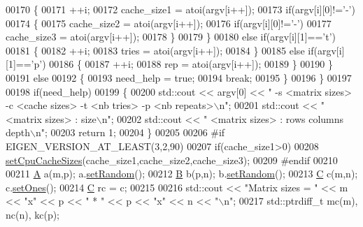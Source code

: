 \begin{DoxyCode}
00170       \{
00171         ++i;
00172         cache\_size1 = atoi(argv[i++]);
00173         \textcolor{keywordflow}{if}(argv[i][0]!=\textcolor{charliteral}{'-'})
00174         \{
00175           cache\_size2 = atoi(argv[i++]);
00176           \textcolor{keywordflow}{if}(argv[i][0]!=\textcolor{charliteral}{'-'})
00177             cache\_size3 = atoi(argv[i++]);
00178         \}
00179       \}
00180       \textcolor{keywordflow}{else} \textcolor{keywordflow}{if}(argv[i][1]==\textcolor{charliteral}{'t'})
00181       \{
00182         ++i;
00183         tries = atoi(argv[i++]);
00184       \}
00185       \textcolor{keywordflow}{else} \textcolor{keywordflow}{if}(argv[i][1]==\textcolor{charliteral}{'p'})
00186       \{
00187         ++i;
00188         rep = atoi(argv[i++]);
00189       \}
00190     \}
00191     \textcolor{keywordflow}{else}
00192     \{
00193       need\_help = \textcolor{keyword}{true};
00194       \textcolor{keywordflow}{break};
00195     \}
00196   \}
00197 
00198   \textcolor{keywordflow}{if}(need\_help)
00199   \{
00200     std::cout << argv[0] << \textcolor{stringliteral}{" -s <matrix sizes> -c <cache sizes> -t <nb tries> -p <nb repeats>\(\backslash\)n"};
00201     std::cout << \textcolor{stringliteral}{"   <matrix sizes> : size\(\backslash\)n"};
00202     std::cout << \textcolor{stringliteral}{"   <matrix sizes> : rows columns depth\(\backslash\)n"};
00203     \textcolor{keywordflow}{return} 1;
00204   \}
00205 
00206 \textcolor{preprocessor}{#if EIGEN\_VERSION\_AT\_LEAST(3,2,90)}
00207   \textcolor{keywordflow}{if}(cache\_size1>0)
00208     \hyperlink{namespace_eigen_ae64421554aa0a4bf9258bafe3170102b}{setCpuCacheSizes}(cache\_size1,cache\_size2,cache\_size3);
00209 \textcolor{preprocessor}{#endif}
00210   
00211   \hyperlink{group___core___module_class_eigen_1_1_matrix}{A} a(m,p); a.\hyperlink{class_eigen_1_1_plain_object_base_af0e576a0e1aefc9ee346de44cc352ba3}{setRandom}();
00212   \hyperlink{group___core___module_class_eigen_1_1_matrix}{B} b(p,n); b.\hyperlink{class_eigen_1_1_plain_object_base_af0e576a0e1aefc9ee346de44cc352ba3}{setRandom}();
00213   \hyperlink{group___core___module_class_eigen_1_1_matrix}{C} c(m,n); c.\hyperlink{class_eigen_1_1_plain_object_base_a2871e88e1feb1cc665fa1f1cc800078b}{setOnes}();
00214   \hyperlink{group___core___module_class_eigen_1_1_matrix}{C} rc = c;
00215 
00216   std::cout << \textcolor{stringliteral}{"Matrix sizes = "} << m << \textcolor{stringliteral}{"x"} << p << \textcolor{stringliteral}{" * "} << p << \textcolor{stringliteral}{"x"} << n << \textcolor{stringliteral}{"\(\backslash\)n"};
00217   std::ptrdiff\_t mc(m), nc(n), kc(p);

\end{DoxyCode}
